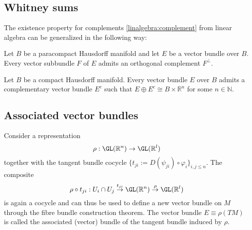 \subsection{Whitney sums}


    The existence property for complements \ref{linalgebra:complement} from linear algebra can be generalized in the following way:
    \begin{property}
        Let $B$ be a paracompact Hausdorff manifold and let $E$ be a vector bundle over $B$. Every vector subbundle $F$ of $E$ admits an orthogonal complement $F^\perp$.
    \end{property}
    \begin{property}\label{bundle:hausdorff}
        Let $B$ be a compact Hausdorff manifold. Every vector bundle $E$ over $B$ admits a complementary vector bundle $E^c$ such that $E\oplus E^c\cong B\times\mathbb{R}^n$ for some $n\in\mathbb{N}$.
    \end{property}


\subsection{Associated vector bundles}

    \begin{construct}\label{bundle:associated_vector_bundle}
        Consider a representation \[\rho:\GL(\mathbb{R}^n)\rightarrow\GL(\mathbb{R}^l)\] together with the tangent bundle cocycle $\{t_{ji} := D(\psi_{ji})\circ\varphi_i\}_{i,j\leq n}$. The composite \[\rho\circ t_{ji}:U_i\cap U_j\overset{t_{ji}}{\rightarrow}\GL(\mathbb{R}^n)\overset{\rho}{\rightarrow}\GL(\mathbb{R}^l)\] is again a cocycle and can thus be used to define a new vector bundle on $M$ through the fibre bundle construction theorem. The vector bundle $E\equiv\rho(TM)$ is called the associated (vector) bundle of the tangent bundle induced by $\rho$.
    \end{construct}

